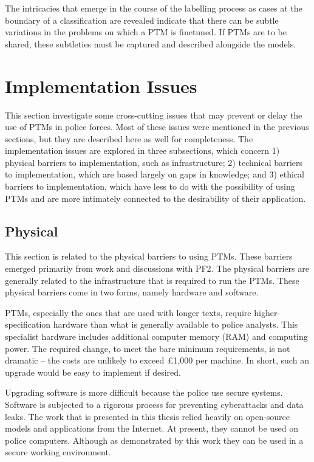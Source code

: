 The intricacies that emerge in the course of the labelling process as cases at the boundary of a classification are revealed indicate that there can be subtle variations in the problems on which a PTM is finetuned. If PTMs are to be shared, these subtleties must be captured and described alongside the models.

\section{Implementation Issues} This section investigate some cross-cutting issues that may prevent or delay the use of PTMs in police forces. Most of these issues were mentioned in the previous sections, but they are described here as well for completeness. The implementation issues are explored in three subsections, which concern 1) physical barriers to implementation, such as infrastructure; 2) technical barriers to implementation, which are based largely on gaps in knowledge; and 3) ethical barriers to implementation, which have less to do with the possibility of using PTMs and are more intimately connected to the desirability of their application. 

\subsection{Physical} This section is related to the physical barriers to using PTMs. These barriers emerged primarily from work and discussions with PF2. The physical barriers are generally related to the infrastructure that is required to run the PTMs. These physical barriers come in two forms, namely hardware and software.

PTMs, especially the ones that are used with longer texts, require higher-specification hardware than what is generally available to police analysts. This specialist hardware includes additional computer memory (RAM) and computing power. The required change, to meet the bare minimum requirements, is not dramatic – the costs are unlikely to exceed £1,000 per machine. In short, such an upgrade would be easy to implement if desired. 

Upgrading software is more difficult because the police use secure systems. Software is subjected to a rigorous process for preventing cyberattacks and data leaks. The work that is presented in this thesis relied heavily on open-source models and applications from the Internet. At present, they cannot be used on police computers. Although as demonstrated by this work they can be used in a secure working environment.

